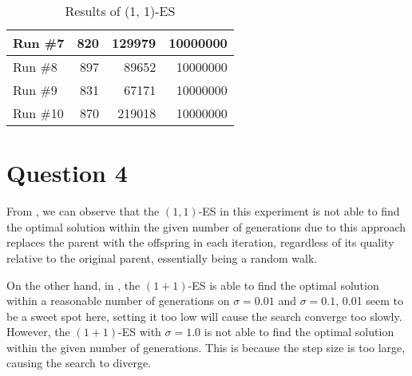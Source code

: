 \documentclass[12pt,letterpaper]{article}
\begin{document}
\begin{table}[H]
{\begin{tabular}{l|r|r|r}
            Run \#7      & 820             & 129979         & 10000000       \\ \hline
            Run \#8      & 897             & 89652          & 10000000       \\ \hline
            Run \#9      & 831             & 67171          & 10000000       \\ \hline
            Run \#10     & 870             & 219018         & 10000000       \\
        \end{tabular}
        \caption{Results of (1, 1)-ES}
        \label{tab:3b}
    }
\end{table}

\section*{Question 4}
From , we can observe that the $(1, 1)$-ES in this experiment is not able to find the optimal solution within the given number of generations due to this approach replaces the parent with the offspring in each iteration, regardless of its quality relative to the original parent, essentially being a random walk. 

On the other hand, in , the $(1+1)$-ES is able to find the optimal solution within a reasonable number of generations on $\sigma = 0.01$ and $\sigma = 0.1$, 0.01 seem to be a sweet spot here, setting it too low will cause the search converge too slowly. However, the $(1+1)$-ES with $\sigma = 1.0$ is not able to find the optimal solution within the given number of generations. This is because the step size is too large, causing the search to diverge.
\end{document}

